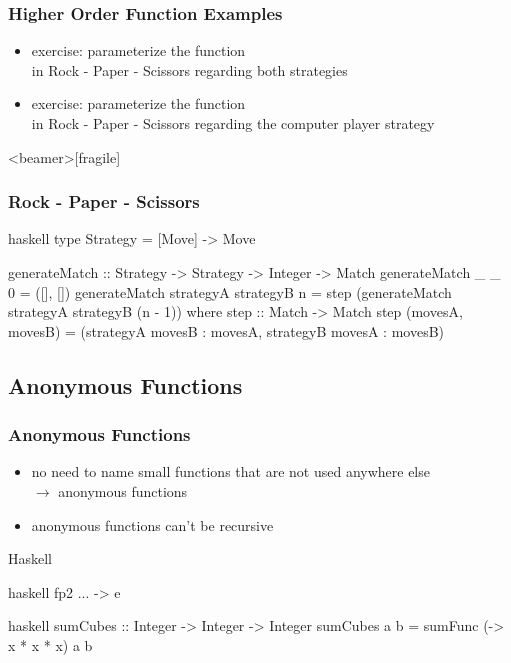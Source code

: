 \documentclass[dvipsnames]{beamer}
\theoremstyle{plain}
\begin{document}
\begin{frame}
  \frametitle{Higher Order Function Examples}

  \begin{itemize}

    \medskip
    \item exercise: parameterize the  function\\
      in Rock - Paper - Scissors regarding both strategies
    \item exercise: parameterize the  function\\
      in Rock - Paper - Scissors regarding the computer player strategy
  \end{itemize}
\end{frame}

\begin{frame}<beamer>[fragile]
  \frametitle{Rock - Paper - Scissors}

  \begin{exampleblock}{}
    \begin{pygments}{haskell}
type Strategy = [Move] -> Move

generateMatch :: Strategy -> Strategy
                     -> Integer -> Match
generateMatch _ _ 0 = ([], [])
generateMatch strategyA strategyB n =
    step (generateMatch strategyA strategyB (n - 1))
      where
        step :: Match -> Match
        step (movesA, movesB) =
            (strategyA movesB : movesA,
             strategyB movesA : movesB)
    \end{pygments}
  \end{exampleblock}
\end{frame}

\subsection{Anonymous Functions}

\begin{frame}[fragile]
  \frametitle{Anonymous Functions}

  \begin{itemize}
    \item no need to name small functions that are not used anywhere else\\
      $\rightarrow$ \alert{anonymous functions}
    \item anonymous functions can't be recursive
  \end{itemize}

  \pause
  \begin{block}{Haskell}
    \begin{pygments}{haskell}
       fp2 ... -> e
    \end{pygments}
  \end{block}

  \medskip
  \begin{example}{}
    \begin{pygments}{haskell}
sumCubes :: Integer -> Integer -> Integer
sumCubes a b = sumFunc (\x -> x * x * x) a b
    \end{pygments}
  \end{example}
\end{frame}
\end{document}

